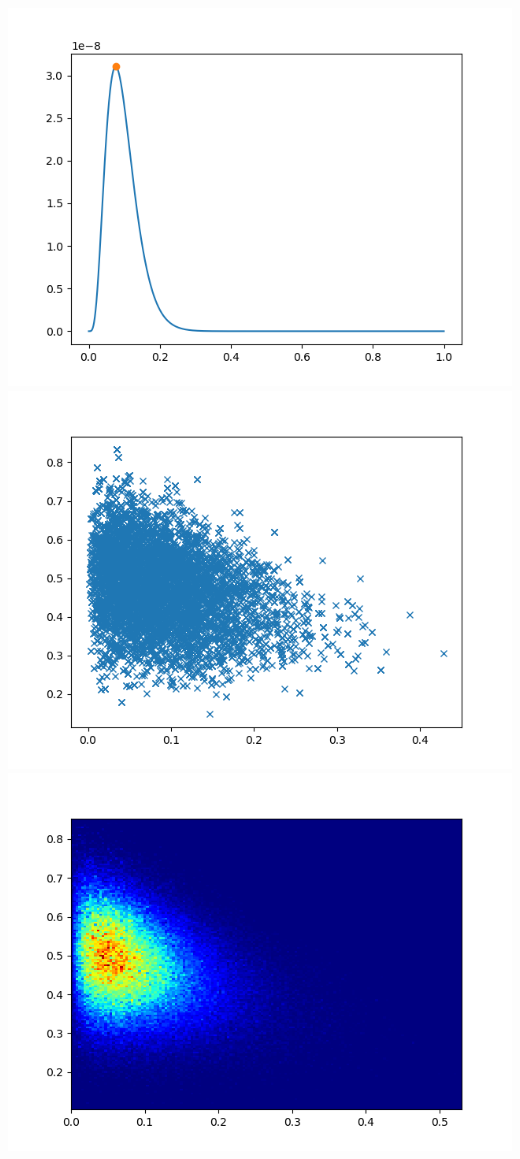 \documentclass[pt12]{article}
\begin{document}
\newpage

\begin{center}
\includegraphics[scale=0.5]{hip9.png}\\
\includegraphics[scale=0.5]{sc9.png}\\
\includegraphics[scale=0.5]{den9.png}\\
\end{center}
\end{document}
